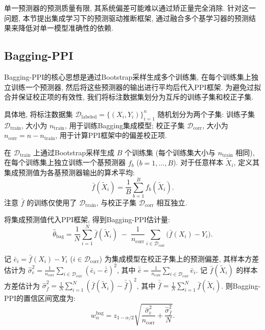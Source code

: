 \documentclass[a4paper, AutoFakeBold, UTF8]{ctexrep}
\theoremstyle{plain}
\numberwithin{equation}{chapter}
\begin{document}
单一预测器的预测质量有限, 其系统偏差可能难以通过矫正量完全消除. 针对这一问题, 本节提出集成学习下的预测驱动推断框架, 通过融合多个基学习器的预测结果来降低对单一模型准确性的依赖. 

\subsection{Bagging-PPI}

Bagging-PPI的核心思想是通过Bootstrap采样生成多个训练集, 在每个训练集上独立训练一个预测器, 然后将这些预测器的输出进行平均后代入PPI框架. 为避免过拟合并保证校正项的有效性, 我们将标注数据集划分为互斥的训练子集和校正子集. 

具体地, 将标注数据集 $\mathcal{D}_{\text{labeled}} = \{ (X_i, Y_i) \}_{i=1}^n$ 随机划分为两个子集: 训练子集 $\mathcal{D}_{\text{train}}$, 大小为 $n_{\text{train}}$, 用于训练Bagging集成模型; 校正子集 $\mathcal{D}_{\text{corr}}$, 大小为 $n_{\text{corr}} = n - n_{\text{train}}$, 用于计算PPI框架中的偏差校正项. 

在 $\mathcal{D}_{\text{train}}$ 上通过Bootstrap采样生成 $B$ 个训练集 (每个训练集大小与 $n_{\text{train}}$ 相同), 在每个训练集上独立训练一个基预测器 $f_b$ ($b=1, \ldots, B$). 对于任意样本 $\tilde{X}_i$, 定义其集成预测值为各基预测器输出的算术平均: 
\begin{equation}
\bar{f} (\tilde{X}_i)  = \frac{1}{B}\sum_{b=1}^{B} f_b (\tilde{X}_i). \label{eq: bag_f_bar}
\end{equation}
注意 $\bar{f}$ 的训练仅使用了 $\mathcal{D}_{\text{train}}$, 与校正子集 $\mathcal{D}_{\text{corr}}$ 相互独立. 

将集成预测值代入PPI框架, 得到Bagging-PPI估计量: 
\begin{equation}
\hat{\theta}_{\text{bag}} = \frac{1}{N}\sum_{i=1}^{N} \bar{f} (\tilde{X}_i)  \; -\;  \frac{1}{n_{\text{corr}}}\sum_{i \in \mathcal{D}_{\text{corr}}} \bigl (\bar{f} (X_i)  - Y_i\bigr). \label{eq: theta_bag}
\end{equation}

记 $\bar{e}_i = \bar{f} (X_i)  - Y_i$ ($i \in \mathcal{D}_{\text{corr}}$) 为集成模型在校正子集上的预测偏差, 其样本方差估计为 $\hat{\sigma}_{\bar{e}}^{2} = \frac{1}{n_{\text{corr}}}\sum_{i \in \mathcal{D}_{\text{corr}}} (\bar{e}_i - \bar{\bar{e}}) ^2$, 其中 $\bar{\bar{e}} = \frac{1}{n_{\text{corr}}}\sum_{i \in \mathcal{D}_{\text{corr}}} \bar{e}_i$. 记 $\bar{f} (\tilde{X}_i) $ 的样本方差估计为 $\hat{\sigma}_{\bar{f}}^{2} = \frac{1}{N}\sum_{i=1}^{N} (\bar{f} (\tilde{X}_i)  - \bar{\bar{f}}) ^2$, 其中 $\bar{\bar{f}} = \frac{1}{N}\sum_{i=1}^{N} \bar{f} (\tilde{X}_i) $. 则Bagging-PPI的置信区间宽度为: 
\begin{equation}
w_{\alpha}^{\text{bag}} = z_{1-\alpha/2} \sqrt{ \frac{\hat{\sigma}_{\bar{e}}^{2}}{n_{\text{corr}}} + \frac{\hat{\sigma}_{\bar{f}}^{2}}{N} }. \label{eq: w_bag}
\end{equation}
\end{document}
